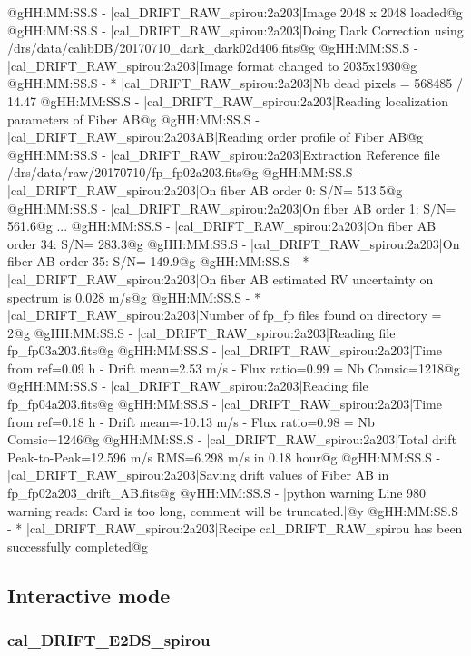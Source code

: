 \begin{cmdboxprintspecial}[fontupper=\tiny, fontlower=\tiny]
@gHH:MM:SS.S -   |cal_DRIFT_RAW_spirou:2a203|Image 2048 x 2048 loaded@g
@gHH:MM:SS.S -   |cal_DRIFT_RAW_spirou:2a203|Doing Dark Correction using /drs/data/calibDB/20170710_dark_dark02d406.fits@g
@gHH:MM:SS.S -   |cal_DRIFT_RAW_spirou:2a203|Image format changed to 2035x1930@g
@gHH:MM:SS.S - * |cal_DRIFT_RAW_spirou:2a203|Nb dead pixels = 568485 / 14.47 %
@gHH:MM:SS.S -   |cal_DRIFT_RAW_spirou:2a203|Reading localization parameters of Fiber AB@g
@gHH:MM:SS.S -   |cal_DRIFT_RAW_spirou:2a203AB|Reading order profile of Fiber AB@g
@gHH:MM:SS.S -   |cal_DRIFT_RAW_spirou:2a203|Extraction Reference file /drs/data/raw/20170710/fp_fp02a203.fits@g
@gHH:MM:SS.S -   |cal_DRIFT_RAW_spirou:2a203|On fiber AB order 0: S/N= 513.5@g
@gHH:MM:SS.S -   |cal_DRIFT_RAW_spirou:2a203|On fiber AB order 1: S/N= 561.6@g
...
@gHH:MM:SS.S -   |cal_DRIFT_RAW_spirou:2a203|On fiber AB order 34: S/N= 283.3@g
@gHH:MM:SS.S -   |cal_DRIFT_RAW_spirou:2a203|On fiber AB order 35: S/N= 149.9@g
@gHH:MM:SS.S - * |cal_DRIFT_RAW_spirou:2a203|On fiber AB estimated RV uncertainty on spectrum is 0.028 m/s@g
@gHH:MM:SS.S - * |cal_DRIFT_RAW_spirou:2a203|Number of fp_fp files found on directory = 2@g
@gHH:MM:SS.S -   |cal_DRIFT_RAW_spirou:2a203|Reading file fp_fp03a203.fits@g
@gHH:MM:SS.S -   |cal_DRIFT_RAW_spirou:2a203|Time from ref=0.09 h  - Drift mean=2.53 m/s - Flux ratio=0.99 = Nb Comsic=1218@g
@gHH:MM:SS.S -   |cal_DRIFT_RAW_spirou:2a203|Reading file fp_fp04a203.fits@g
@gHH:MM:SS.S -   |cal_DRIFT_RAW_spirou:2a203|Time from ref=0.18 h  - Drift mean=-10.13 m/s - Flux ratio=0.98 = Nb Comsic=1246@g
@gHH:MM:SS.S -   |cal_DRIFT_RAW_spirou:2a203|Total drift Peak-to-Peak=12.596 m/s RMS=6.298 m/s in 0.18 hour@g
@gHH:MM:SS.S -   |cal_DRIFT_RAW_spirou:2a203|Saving drift values of Fiber AB in fp_fp02a203_drift_AB.fits@g
@yHH:MM:SS.S - \@ |python warning Line 980  warning reads: Card is too long, comment will be truncated.|@y
@gHH:MM:SS.S - * |cal_DRIFT_RAW_spirou:2a203|Recipe cal_DRIFT_RAW_spirou has been successfully completed@g
\end{cmdboxprintspecial}

\newpage
\subsection{Interactive mode}

\subsubsection{cal\_DRIFT\_E2DS\_spirou}

